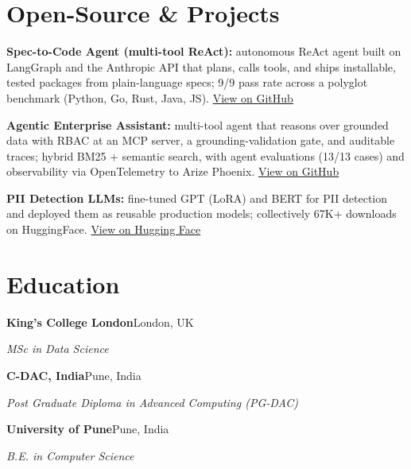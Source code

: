 \documentclass[10pt,a4paper]{article}
\begin{document}
\section{Open-Source \& Projects}
\begin{tight}
  \item \textbf{Spec-to-Code Agent (multi-tool ReAct):} autonomous ReAct agent built on LangGraph and the Anthropic API that plans, calls tools, and ships installable, tested packages from plain-language specs; 9/9 pass rate across a polyglot benchmark (Python, Go, Rust, Java, JS). \href{https://github.com/abhijeetscode/Spec-to-Code-Agent}{View on GitHub}
  \item \textbf{Agentic Enterprise Assistant:} multi-tool agent that reasons over grounded data with RBAC at an MCP server, a grounding-validation gate, and auditable traces; hybrid BM25 + semantic search, with agent evaluations (13/13 cases) and observability via OpenTelemetry to Arize Phoenix. \href{https://github.com/abhijeetscode/Agentic-Enterprise-Assistant}{View on GitHub}
  \item \textbf{PII Detection LLMs:} fine-tuned GPT (LoRA) and BERT for PII detection and deployed them as reusable production models; collectively 67K+ downloads on HuggingFace. \href{https://huggingface.co/ab-ai/pii_model}{View on Hugging Face}
\end{tight}

\section{Education}
{\color{company}\bfseries King's College London}\hfill {\color{muted}London, UK}\par
{\itshape MSc in Data Science}\par\vspace{2pt}
{\color{company}\bfseries C-DAC, India}\hfill {\color{muted}Pune, India}\par
{\itshape Post Graduate Diploma in Advanced Computing (PG-DAC)}\par\vspace{2pt}
{\color{company}\bfseries University of Pune}\hfill {\color{muted}Pune, India}\par
{\itshape B.E. in Computer Science}\par
\end{document}
